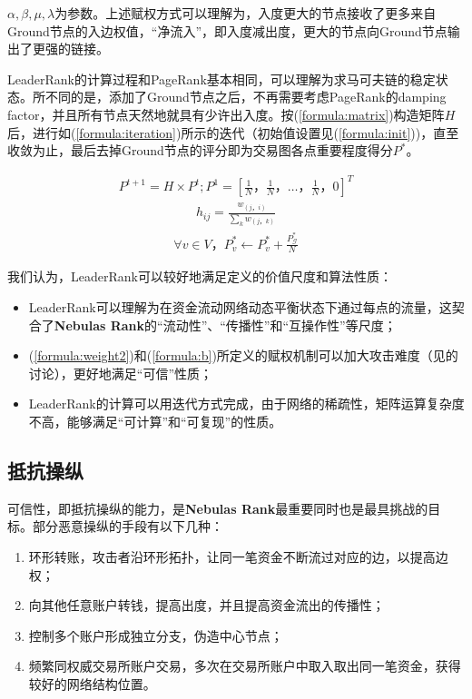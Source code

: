 $\alpha, \beta, \mu, \lambda$为参数。上述赋权方式可以理解为，入度更大的节点接收了更多来自Ground节点的入边权值，“净流入”，即入度减出度，更大的节点向Ground节点输出了更强的链接。

LeaderRank的计算过程和PageRank基本相同，可以理解为求马可夫链的稳定状态。所不同的是，添加了Ground节点之后，不再需要考虑PageRank的damping factor\cite{Brin2010}\cite{page1999pagerank}，并且所有节点天然地就具有少许出入度。按(\ref{formula:matrix})构造矩阵$H$后，进行如(\ref{formula:iteration})所示的迭代（初始值设置见(\ref{formula:init}))，直至收敛为止，最后去掉Ground节点的评分即为交易图各点重要程度得分$P^*$。

\begin{align} \label{formula:iteration}
	P^{t+1} = H \times P^{t}; P^1=[\frac{1}{N}， \frac{1}{N}， \dots， \frac{1}{N}， 0]^T
\end{align}
\begin{align} \label{formula:matrix}
	h_{ij} = \frac{w_{(j，i)}}{\sum_k w_{(j，k)}}
\end{align}
\begin{align} \label{formula:init}
\forall v \in V， P^*_v \leftarrow P^*_v + \frac{P^*_{\mathcal{G}}}{N}
\end{align}


我们认为，LeaderRank可以较好地满足定义的价值尺度和算法性质：
\begin{itemize}
	\item LeaderRank可以理解为在资金流动网络动态平衡状态下通过每点的流量，这契合了\textbf{Nebulas Rank}的“流动性”、“传播性”和“互操作性”等尺度；
	\item (\ref{formula:weight2})和(\ref{formula:b})所定义的赋权机制可以加大攻击难度（见的讨论），更好地满足“可信”性质；
	\item LeaderRank的计算可以用迭代方式完成，由于网络的稀疏性，矩阵运算复杂度不高，能够满足“可计算”和“可复现”的性质。
\end{itemize}


\subsection{抵抗操纵}\label{subsec:robust}

可信性，即抵抗操纵的能力，是\textbf{Nebulas Rank}最重要同时也是最具挑战的目标。部分恶意操纵的手段有以下几种：
\begin{enumerate}
	\item 环形转账，攻击者沿环形拓扑，让同一笔资金不断流过对应的边，以提高边权；
	\item 向其他任意账户转钱，提高出度，并且提高资金流出的传播性；
	\item 控制多个账户形成独立分支，伪造中心节点；
	\item 频繁同权威交易所账户交易，多次在交易所账户中取入取出同一笔资金，获得较好的网络结构位置。
\end{enumerate}

